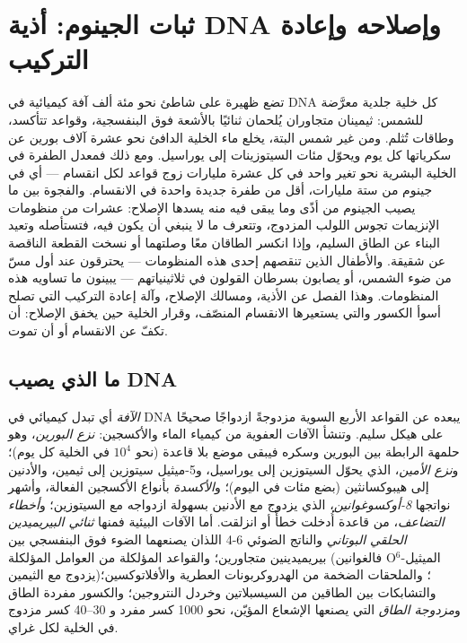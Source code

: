 \chapter{ثبات الجينوم: أذية DNA وإصلاحه وإعادة التركيب}\label{ch:b3:dna-repair}

تضع ظهيرة على شاطئ نحو مئة ألف آفة كيميائية في DNA كل خلية جلدية
معرَّضة للشمس: ثيمينان متجاوران يُلحمان ثنائيًا بالأشعة فوق البنفسجية،
وقواعد تتأكسد، وطاقات تُثلم. ومن غير شمس البتة، يخلع ماء الخلية
الدافئ نحو عشرة آلاف بورين عن سكرياتها كل يوم ويحوّل مئات
السيتوزينات إلى يوراسيل. ومع ذلك فمعدل الطفرة في الخلية البشرية نحو
تغير واحد في كل عشرة مليارات زوج قواعد لكل انقسام --- أي في جينوم
من ستة مليارات، أقل من طفرة جديدة واحدة في الانقسام. والفجوة بين ما
يصيب الجينوم من أذًى وما يبقى فيه منه يسدها الإصلاح: عشرات من منظومات
الإنزيمات تجوس اللولب المزدوج، وتتعرف ما لا ينبغي أن يكون فيه،
فتستأصله وتعيد البناء عن الطاق السليم، وإذا انكسر الطاقان معًا
وصلتهما أو نسخت القطعة الناقصة عن شقيقة. والأطفال الذين تنقصهم إحدى
هذه المنظومات --- يحترقون عند أول مسّ من ضوء الشمس، أو يصابون بسرطان
القولون في ثلاثينياتهم --- يبينون ما تساويه هذه المنظومات. وهذا الفصل
عن الأذية، ومسالك الإصلاح، وآلة إعادة التركيب التي تصلح أسوأ الكسور
والتي يستعيرها الانقسام المنصّف، وقرار الخلية حين يخفق الإصلاح: أن
تكفّ عن الانقسام أو أن تموت.

\section{ما الذي يصيب DNA}

\begin{definition}\label{def:b3:dna-repair:lesions}
\emph{الآفة} أي تبدل كيميائي في DNA يبعده عن القواعد الأربع السوية
مزدوجةً ازدواجًا صحيحًا على هيكل سليم. وتنشأ الآفات العفوية من كيمياء
الماء والأكسجين: \emph{نزع البورين}، وهو حلمهة الرابطة بين البورين
وسكره فيبقى موضع بلا قاعدة (نحو $10^{4}$ في الخلية كل يوم)؛ و\emph{نزع
الأمين}، الذي يحوّل السيتوزين إلى يوراسيل، و5-ميثيل سيتوزين إلى
ثيمين، والأدنين إلى هيبوكسانثين (بضع مئات في اليوم)؛ و\emph{الأكسدة}
بأنواع الأكسجين الفعالة، وأشهر نواتجها \emph{8-أوكسوغوانين}، الذي
يزدوج مع الأدنين بسهولة ازدواجه مع السيتوزين؛ و\emph{أخطاء
التضاعف}، من قاعدة أُدخلت خطأً أو انزلقت. أما الآفات البيئية فمنها
\emph{ثنائي البيريميدين الحلقي البوتاني} والناتج الضوئي 6-4 اللذان
يصنعهما الضوء فوق البنفسجي بين بيريميدينين متجاورين؛ والقواعد
المؤلكلة من العوامل المؤلكلة (فالغوانين O$^{6}$-الميثيل
يزدوج مع الثيمين)؛ والملحقات الضخمة من الهدروكربونات العطرية
والأفلاتوكسين؛ والتشابكات بين الطاقين من السيسبلاتين وخردل
النتروجين؛ والكسور مفردة الطاق و\emph{مزدوجة الطاق}
التي يصنعها الإشعاع المؤيّن، نحو \num{1000} كسر مفرد و
\numrange{30}{40} كسر مزدوج في الخلية لكل غراي.
\end{definition}

